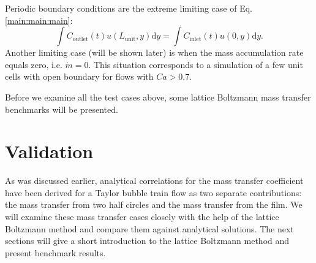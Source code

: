 \documentclass[review,12pt]{elsarticle}
\newcommand{\beqstar}{\begin{equation*}}
\newcommand{\feqstar}{\end{equation*}}
\newcommand{\lunit}{L_{\mathrm{unit}}}
\newcommand{\cinlet}{C_{\mathrm{inlet}}}
\newcommand{\coutlet}{C_{\mathrm{outlet}}}
\begin{document}
Periodic boundary conditions are the extreme
limiting case of Eq. \ref{main:main:main}: 
\beqstar
\int{\coutlet(t)
u(\lunit,y)\mathrm{d}y}=\int{\cinlet(t) u(0,y)\mathrm{d}y}. 
\feqstar
Another limiting case (will be shown later) is when the mass accumulation rate equals zero, i.e. $\dot{m}=0$. 
This situation corresponds to a simulation of a few unit cells with open boundary for flows with
$Ca>0.7$.   

Before we examine all the test cases above, some lattice Boltzmann mass transfer
benchmarks will be presented. 

\section{Validation}
As was discussed earlier, analytical correlations for the mass transfer coefficient
have been derived for a Taylor bubble train flow  as two separate contributions: the mass transfer from two
half circles and the mass transfer from the film. We will examine these
mass transfer cases closely with the help of the lattice Boltzmann method and compare them
against analytical
solutions. The next sections will give a short introduction to the lattice Boltzmann method and present benchmark results.
\end{document}
